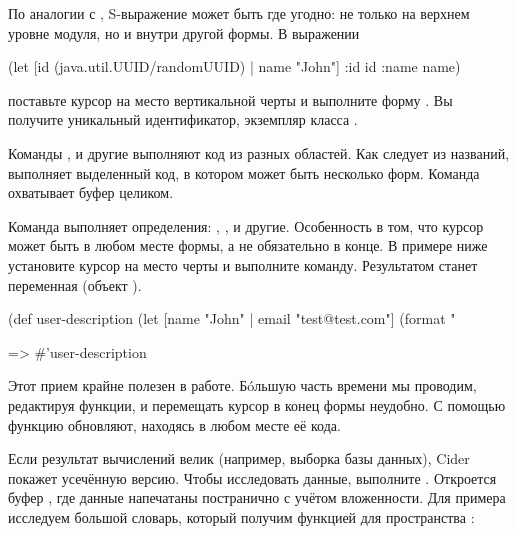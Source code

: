 
По аналогии с , S-выражение может быть где угодно: не только на верхнем уровне модуля, но и внутри другой формы. В выражении

\begin{english}
  \begin{clojure}
(let [id (java.util.UUID/randomUUID) |
      name "John"]
  {:id id
   :name name})
  \end{clojure}
\end{english}

\noindent
поставьте курсор на место вертикальной черты и выполните форму . Вы получите уникальный идентификатор, экземпляр класса .


Команды ,  и другие выполняют код из разных областей. Как следует из названий,  выполняет выделенный код, в котором может быть несколько форм. Команда  охватывает буфер целиком.

Команда  выполняет определения: , ,  и другие. Особенность в том, что курсор может быть в любом месте формы, а не обязательно в конце. В примере ниже установите курсор на место черты и выполните команду. Результатом станет переменная  (объект ).

\begin{english}
  \begin{clojure}
(def user-description
  (let [name "John" |
        email "test@test.com"]
    (format "%

=> #'user-description
  \end{clojure}
\end{english}

Этот прием крайне полезен в работе. Бóльшую часть времени мы проводим, редактируя функции, и перемещать курсор в конец формы неудобно. С помощью  функцию обновляют, находясь в любом месте её кода.

Если результат вычислений велик (например, выборка базы данных), Cider покажет усечённую версию. Чтобы исследовать данные, выполните . Откроется буфер , где данные напечатаны постранично с учётом вложенности. Для примера исследуем большой словарь, который получим функцией  для пространства :

